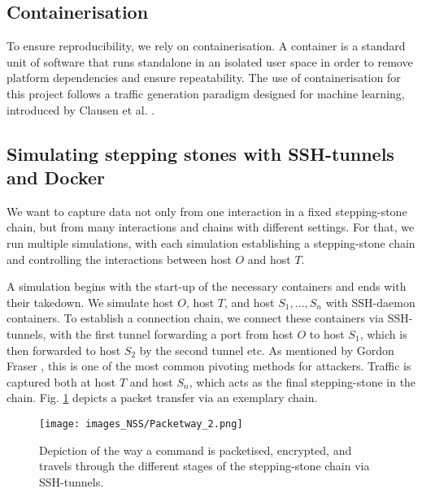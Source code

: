 \subsection{Containerisation}

To ensure reproducibility, we rely on containerisation. A container is a standard unit of software that runs standalone in an isolated user space in order to remove platform dependencies and ensure repeatability. The use of containerisation for this project follows a traffic generation paradigm designed for machine learning, introduced by Clausen et al. \cite{clausen2019traffic}.

\subsection{Simulating stepping stones with SSH-tunnels and Docker}\label{SecN:Setup}

We want to capture data not only from one interaction in a fixed stepping-stone chain, but from many interactions and chains with different settings. For that, we run multiple simulations, with each simulation establishing a stepping-stone chain and controlling the interactions between host $O$ and host $T$. %

A simulation begins with the start-up of the necessary containers and ends with their takedown. We simulate host $O$, host $T$, and host $S_1,\dots,S_n$ with SSH-daemon containers. To establish a connection chain, we connect these containers via SSH-tunnels, with the first tunnel forwarding a port from host $O$ to host $S_1$, which is then forwarded to host $S_2$ by the second tunnel etc. As mentioned by Gordon Fraser \cite{pivoting2015}, this is one of the most common pivoting methods for attackers. Traffic is captured both at host $T$ and host $S_n$, which acts as the final stepping-stone in the chain.
Fig. \ref{figN:Packetway} depicts a packet transfer via an exemplary chain. 


\begin{figure}
\centering
\texttt{[image: images\_NSS/Packetway\_2.png]}
\caption{Depiction of the way a command is packetised, encrypted, and travels through the different stages of the stepping-stone chain via SSH-tunnels.}\label{figN:Packetway}
\vspace{-0.4cm}
\end{figure}


\vspace{-0.6cm}
